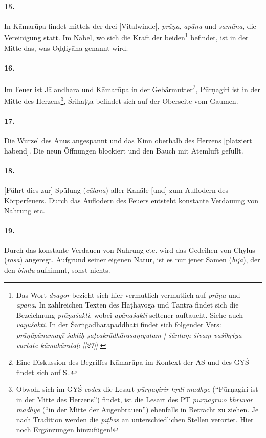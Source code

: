 \documentclass[a4paper,12pt]{article}
\begin{document}
\paragraph{15.} In Kāmarūpa findet mittels der drei [Vitalwinde], \textit{prāṇa}, \textit{apāna} und \textit{samāna}, die Vereinigung statt. 
Im Nabel, wo sich die Kraft der beiden\footnote{Das Wort \textit{dvayor} bezieht sich hier vermutlich vermutlich auf \textit{prāṇa} und \textit{apāna}. In zahlreichen Texten des Haṭhayoga und Tantra findet sich die Bezeichnung \textit{prāṇaśakti}, wobei \textit{apānaśakti} seltener auftaucht. Siehe auch \textit{vāyuśakti}. In der Śārṅgadharapaddhati findet sich folgender Vers: \textit{prāṇāpānamayī śaktiḥ ṣaṭcakrādhārasaṃyutam | śāntaṃ śivaṃ vaśīkṛtya vartate kāmakārataḥ ||27||} \parencite[654]{peterson1888}} befindet, ist in der Mitte das, was Oḍḍiyāna genannt wird.

\paragraph{16.} Im Feuer ist Jālandhara und Kāmarūpa in der Gebärmutter\footnote{Eine Diskussion des Begriffes Kāmarūpa im Kontext der AS und des GYŚ findet sich auf S.\pageref{kamarupa}.}, Pūrṇagiri ist in der Mitte des Herzens\footnote{Obwohl sich im GYŚ-\textit{codex} die Lesart \textit{pūrṇagirir hṛdi madhye} (``Pūrṇagiri ist in der Mitte des Herzens'') findet, ist die Lesart des PT \textit{pūrṇagrīvo bhrūvor madhye} (``in der Mitte der Augenbrauen'') ebenfalls in Betracht zu ziehen. Je nach Tradition werden die \textit{pīṭha}s an unterschiedlichen Stellen verortet. Hier noch Ergänzungen hinzufügen!}, Śrihaṭṭa befindet sich auf der Oberseite vom Gaumen. 

\paragraph{17.} Die Wurzel des Anus angespannt und das Kinn oberhalb des Herzens [platziert habend]. Die neun Öffnungen blockiert und den Bauch mit Atemluft gefüllt.

\paragraph{18.} [Führt dies zur] Spülung (\textit{cālana}) aller Kanäle [und] zum Auflodern des Körperfeuers. Durch das Auflodern des Feuers entsteht konstante Verdauung von Nahrung etc.

\paragraph{19.} Durch das konstante Verdauen von Nahrung etc. wird das Gedeihen von Chylus (\textit{rasa}) angeregt. Aufgrund seiner eigenen Natur, ist es nur jener Samen (\textit{bīja}), der den \textit{bindu} aufnimmt, sonst nichts. 
\end{document}
